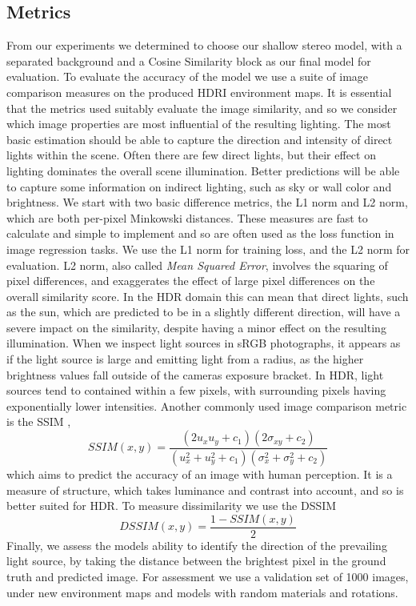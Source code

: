 \documentclass[ %
                    author={Gavin Parker},
                supervisor={Dr. Neill Campbell},
                    degree={MEng},
                     title={Deep Learning for Illumination Estimation from Stereo Images},
                  subtitle={},
                      type={Research},
                      year={2018} ]{dissertation}
\begin{document}
\subsection{Metrics}
From our experiments we determined to choose our shallow stereo model, with a separated background and a Cosine Similarity block as our final model for evaluation. To evaluate the accuracy of the model we use a suite of image comparison measures on the produced HDRI environment maps. It is essential that the metrics used suitably evaluate the image similarity, and so we consider which image properties are most influential of the resulting lighting. The most basic estimation should be able to capture the direction and intensity of direct lights within the scene. Often there are few direct lights, but their effect on lighting dominates the overall scene illumination. Better predictions will be able to capture some information on indirect lighting, such as sky or wall color and brightness.
\newline 
We start with two basic difference metrics, the L1 norm and L2 norm, which are both per-pixel Minkowski distances. These measures are fast to calculate and simple to implement and so are often used as the loss function in image regression tasks. We use the L1 norm for training loss, and the L2 norm for evaluation. L2 norm, also called \textit{Mean Squared Error}, involves the squaring of pixel differences, and exaggerates the effect of large pixel differences on the overall similarity score. In the HDR domain this can mean that direct lights, such as the sun, which are predicted to be in a slightly different direction, will have a severe impact on the similarity, despite having a minor effect on the resulting illumination. When we inspect light sources in sRGB photographs, it appears as if the light source is large and emitting light from a radius, as the higher brightness values fall outside of the cameras exposure bracket. In HDR, light sources tend to contained within a few pixels, with surrounding pixels having exponentially lower intensities.
\newline
Another commonly used image comparison metric is the SSIM \cite{1284395},
\[SSIM(x,y) = \frac{(2u_xu_y + c_1)(2\sigma_{xy} + c_2)}{(u^2_x + u^2_y + c_1)(\sigma^2_x + \sigma^2_y + c_2)}\]
which aims to predict the accuracy of an image with human perception. It is a measure of structure, which takes luminance and contrast into account, and so is better suited for HDR. To measure dissimilarity we use the DSSIM \[DSSIM(x,y) = \frac{1 - SSIM(x,y)}{2}\] Finally, we assess the models ability to identify the direction of the prevailing light source, by taking the distance between the brightest pixel in the ground truth and predicted image. For assessment we use a validation set of 1000 images, under new environment maps and models with random materials and rotations.
\end{document}
